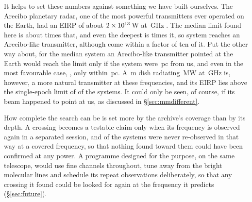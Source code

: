 It helps to set these numbers against something we have built ourselves. The Arecibo planetary radar, one
of the most powerful transmitters ever operated on the Earth, had an EIRP of
about $2\times10^{13}$\,W at \AroFreqGHz\,GHz \citep{EarthDetectingEarth2025}. The
median limit found here is about \AroMedMult{} times that, and even the
deepest is \AroDeepMult{} times it, so \AroNSysBelowWord{} system reaches an
Arecibo-like transmitter, although \AroNSysTen{} come within a factor of ten
of it. Put the other way about, for the median system an Arecibo-like
transmitter pointed at the Earth would reach the limit only if the system
were \AroDistMedPc\,pc from us, and even in the most favourable case,
\AroDistMaxStar, only within \AroDistMaxPc\,pc. A
\BenchDiam\,m dish radiating \BenchPowerMW\,MW at \BenchFreqGHz\,GHz is,
however, a more natural transmitter at these frequencies, and its EIRP lies
above the single-epoch limit of \BenchNSysA{} of the systems. It could only be
seen, of course, if its beam happened to point at us, as discussed in
\S\ref{sec:mmdifferent}.

How complete the search can be is set more by the archive's coverage than by
its depth. A crossing becomes a testable claim only when its frequency is
observed again in a separated session, and \ZcNoRepSys{} of the
\NSysClassA{} systems were never re-observed in that way at a covered
frequency, so that nothing found toward them could have been confirmed at any
power. A programme designed for the purpose, on the same telescope, would use fine channels throughout, tune away from the bright
molecular lines and schedule its repeat observations deliberately, so that
any crossing it found could be looked for again at the frequency it predicts
(\S\ref{sec:future}).
